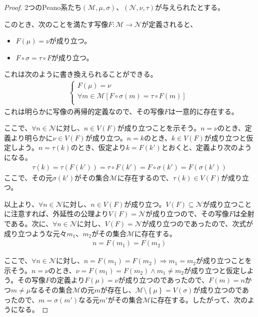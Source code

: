 \documentclass[dvipdfmx]{jsarticle}
\begin{document}
\begin{proof}
2つのPeano系たち$\left( \mathcal{M,}\mu,\sigma \right)$、$\left( \mathcal{N,}\nu,\tau \right)$が与えられたとする。\par
このとき、次のことを満たす写像$F\mathcal{:M \rightarrow N}$が定義されると、
\begin{itemize}
\item
  $F(\mu) = \nu$が成り立つ。
\item
  $F \circ \sigma = \tau \circ F$が成り立つ。
\end{itemize}
これは次のように書き換えられることができる。
\begin{align*}
\left\{ \begin{matrix}
F(\mu) = \nu \\
\forall m\in \mathcal{M}\left[ F \circ \sigma(m) = \tau \circ F(m) \right] \\
\end{matrix} \right.\ 
\end{align*}
これは明らかに写像の再帰的定義なので、その写像$F$は一意的に存在する。\par
ここで、$\forall n \in \mathcal{N}$に対し、$n \in V(F)$が成り立つことを示そう。$n = \nu$のとき、定義より明らかに$\nu \in V(F)$が成り立つ。$n = k$のとき、$k \in V(F)$が成り立つと仮定しよう。$n = \tau(k)$のとき、仮定より$k = F\left( k' \right)$とおくと、定義より次のようになる。
\begin{align*}
\tau(k) = \tau\left( F\left( k' \right) \right) = \tau \circ F\left( k' \right) = F \circ \sigma\left( k' \right) = F\left( \sigma\left( k' \right) \right)
\end{align*}
ここで、その元$\sigma\left( k' \right)$がその集合$\mathcal{M}$に存在するので、$\tau(k) \in V(F)$が成り立つ。\par
以上より、$\forall n \in \mathcal{N}$に対し、$n \in V(F)$が成り立つ。$V(F) \subseteq \mathcal{N}$が成り立つことに注意すれば、外延性の公理より$V(F) = \mathcal{N}$が成り立つので、その写像$F$は全射である。次に、$\forall n \in \mathcal{N}$に対し、$V(F) = \mathcal{N}$が成り立つのであったので、次式が成り立つような元々$m_{1}$、$m_{2}$がその集合$\mathcal{M}$に存在する。
\begin{align*}
n = F\left( m_{1} \right) = F\left( m_{2} \right)
\end{align*}\par
ここで、$\forall n \in \mathcal{N}$に対し、$n = F\left( m_{1} \right) = F\left( m_{2} \right) \Rightarrow m_{1} = m_{2}$が成り立つことを示そう。$n = \nu$のとき、$\nu = F\left( m_{1} \right) = F\left( m_{2} \right) \land m_{1} \neq m_{2}$が成り立つと仮定しよう。その写像$F$の定義より$F(\mu) = \nu$が成り立つのであったので、$F(m) = n$かつ$m \neq \mu$なるその集合$\mathcal{M}$の元$m$が存在し、$\mathcal{M \setminus}\left\{ \mu \right\} = V(\sigma)$が成り立つのであったので、$m = \sigma\left( m' \right)$なる元$m'$がその集合$\mathcal{M}$に存在する。したがって、次のようになる。

\end{proof}
\end{document}
